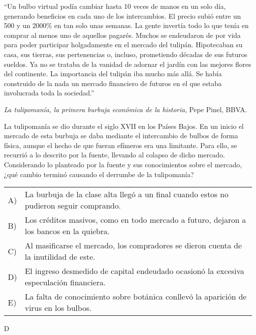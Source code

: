 \documentclass[letterpaper,11pt]{article}
\newcommand{\anchopregunta}{0.9\textwidth}
\begin{document}
\begin{enumerate}
\begin{minipage}{\anchopregunta}
\item ``Un bulbo virtual podía cambiar hasta 10 veces de manos en un solo día, generando beneficios en cada uno de los intercambios.  El precio subió entre un 500 y un 2000\% en tan solo unas semanas. La gente invertía todo lo que tenía en comprar al menos uno de aquellos pagarés.
Muchos se endeudaron de por vida para poder participar holgadamente en el mercado del tulipán. Hipotecaban su casa, sus tierras, sus pertenencias o, incluso, prometiendo décadas de sus futuros sueldos.  Ya no se trataba de la vanidad de adornar el jardín con las mejores flores del continente. La importancia del tulipán iba mucho más allá. Se había construido de la nada un mercado financiero de futuros en el que estaba involucrada toda la sociedad.''\\
\begin{flushright}
\textit{La tulipomanía, la primera burbuja económica de la historia}, Pepe Pinel, BBVA.
\end{flushright}
La tulipomanía se dio durante el siglo XVII en los Países Bajos. En un inicio el mercado de esta burbuja se daba mediante el intercambio de bulbos de forma física, aunque el hecho de que fueran efímeros era una limitante. Para ello, se recurrió a lo descrito por la fuente, llevando al colapso de dicho mercado. Considerando lo planteado por la fuente y sus conocimientos sobre el mercado, ¿qué cambio terminó causando el derrumbe de la tulipomanía?
\begin{flushleft}\begin{tabular}{@{\hspace{-.001\textwidth}}l@{\hspace{2pt}}p{}}
A)& La burbuja de la clase alta llegó a un final cuando estos no pudieron seguir comprando.\\
B)& Los créditos masivos, como en todo mercado a futuro, dejaron a los bancos en la quiebra.\\
C)& Al masificarse el mercado, los compradores se dieron cuenta de la inutilidad de este.\\
D)& El ingreso desmedido de capital endeudado ocasionó la excesiva especulación financiera.\\
E)& La falta de conocimiento sobre botánica conllevó la aparición de virus en los bulbos.\\ 
\end{tabular}\end{flushleft}%
\begin{key} D

\end{key}
\end{minipage}
\end{enumerate}
\end{document}
